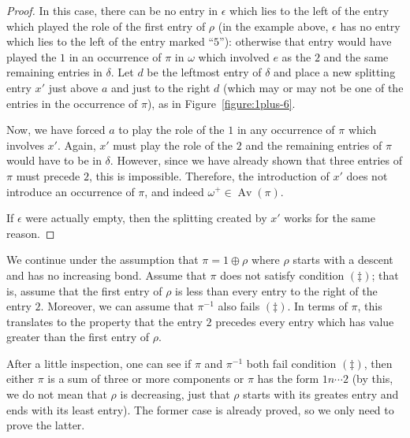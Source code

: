\documentclass[10pt]{article}
\theoremstyle{plain}
\newcommand{\Av}{\operatorname{Av}}
\begin{document}
\begin{proof}
	In this case, there can be no entry in $\epsilon$ which lies to the left of the entry which played the role of the first entry of $\rho$ (in the example above, $\epsilon$ has no entry which lies to the left of the entry marked ``$5$''): otherwise that entry would have played the $1$ in an occurrence of $\pi$ in $\omega$ which involved $e$ as the $2$ and the same remaining entries in $\delta$. Let $d$ be the leftmost entry of $\delta$ and place a new splitting entry $x'$ just above $a$ and just to the right $d$ (which may or may not be one of the entries in the occurrence of $\pi$), as in Figure~\ref{figure:1plus-6}.
  
Now, we have forced $a$ to play the role of the $1$ in any occurrence of $\pi$ which involves $x'$. Again, $x'$ must play the role of the $2$ and the remaining entries of $\pi$ would have to be in $\delta$. However, since we have already shown that three entries of $\pi$ must precede $2$, this is impossible. Therefore, the introduction of $x'$ does not introduce an occurrence of $\pi$, and indeed $\omega^+ \in \Av(\pi)$.

If $\epsilon$ were actually empty, then the splitting created by $x'$ works for the same reason.
\end{proof}

We continue under the assumption that $\pi = 1 \oplus \rho$ where $\rho$ starts with a descent and has no increasing bond. Assume that $\pi$ does not satisfy condition $(\ddagger)$; that is, assume that the first entry of $\rho$ is less than every entry to the right of the entry $2$. Moreover, we can assume that $\pi^{-1}$ also fails $(\ddagger)$. In terms of $\pi$, this translates to the property that the entry $2$ precedes every entry which has value greater than the first entry of $\rho$.

After a little inspection, one can see if $\pi$ and $\pi^{-1}$ both fail condition $(\ddagger)$, then either $\pi$ is a sum of three or more components or $\pi$ has the form $1n\cdots 2$ (by this, we do not mean that $\rho$ is decreasing, just that $\rho$ starts with its greates entry and ends with its least entry). The former case is already proved, so we only need to prove the latter.
\end{document}
